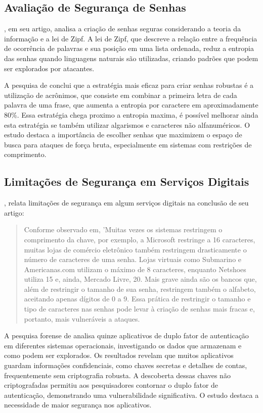 \documentclass[12pt]{article}
\begin{document}
\subsection{Avaliação de Segurança de Senhas}

\cite{article:1}, em seu artigo, analisa a criação de senhas seguras considerando
a teoria da informação e a lei de Zipf.
A lei de Zipf, que descreve a relação entre a frequência de ocorrência de
palavras e sua posição em uma lista ordenada, reduz a entropia das senhas
quando linguagens naturais são utilizadas, criando padrões que podem ser
explorados por atacantes.

A pesquisa de \cite{article:1} conclui que a estratégia mais eficaz para criar senhas
robustas é a utilização de acrônimos, que consiste em combinar a primeira letra de
cada palavra de uma frase, que aumenta a entropia por caractere em aproximadamente 80\%.
Essa estratégia chega proximo a entropia maxima, é possível melhorar ainda esta
estratégia se também utilizar algarismos e caracteres não alfanuméricos.
O estudo destaca a importância de escolher senhas que maximizem o espaço
de busca para ataques de força bruta, especialmente em sistemas com
restrições de comprimento.

\subsection{Limitações de Segurança em Serviços Digitais}

\cite{article:1}, relata limitações de segurança em algum serviços
digitais na conclusão de seu artigo:
\begin{quote}
  Conforme observado em, 'Muitas vezes os sistemas restringem o comprimento da chave, por exemplo, a
  Microsoft restringe a 16 caracteres, muitas lojas de comércio eletrônico também restringem drasticamente o
  número de caracteres de uma senha. Lojas virtuais como Submarino e Americanas.com utilizam o máximo de 8
  caracteres, enquanto Netshoes utiliza 15 e, ainda, Mercado Livre, 20. Mais grave ainda são os bancos que,
  além de restringir o tamanho de sua senha, restringem também o alfabeto, aceitando apenas dígitos de 0 a 9.
  Essa prática de restringir o tamanho e tipo de caracteres nas senhas pode levar à criação de senhas mais
  fracas e, portanto, mais vulneráveis a ataques. \cite{article:1}
\end{quote}

A pesquisa forense de \cite{article:2} analisa quinze aplicativos de duplo fator de
autenticação em diferentes sistemas operacionais, investigando os dados que armazenam
e como podem ser explorados.
Os resultados revelam que muitos aplicativos guardam informações confidenciais, como
chaves secretas e detalhes de contas, frequentemente sem criptografia robusta.
A descoberta dessas chaves não criptografadas permitiu aos pesquisadores contornar o 
duplo fator de autenticação, demonstrando uma vulnerabilidade significativa.
O estudo destaca a necessidade de maior segurança nos aplicativos.
\end{document}
